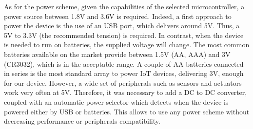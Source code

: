 As for the power scheme, given the capabilities of the selected microcontroller, a power source between 1.8V and 3.6V is required.
Indeed, a first approach to power the device is the use of an USB port, which delivers around 5V.
Thus, a 5V to 3.3V (the recommended tension) is required.
In contrast, when the device is needed to run on batteries, the supplied voltage will change.
The most common batteries available on the market provide between 1.5V (AA, AAA) and 3V (CR3032), which is in the acceptable range.
A couple of AA batteries connected in series is the most standard array to power IoT devices, delivering 3V, enough for our device.
However, a wide set of peripherals such as sensors and actuators work very often at 5V.
Therefore, it was necessary to add a DC to DC converter, coupled with an automatic power selector which detects when the device is powered either by USB or batteries.
This allows to use any power scheme without decreasing performance or peripherals compatibility.

